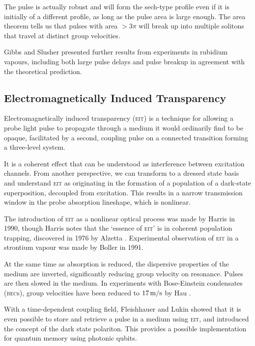     The pulse is actually robust and will form the sech-type profile even if it
    is initially of a different profile, as long as the pulse area is large
    enough. The area theorem\cite{McCall1969} tells us that pulses with area $>
    3\pi$ will break up into multiple solitons that travel at distinct group
    velocities.

    Gibbs and Slusher presented further results from experiments in rubidium
    vapours,\cite{Slusher1972} including both large pulse delays and pulse
    breakup in agreement with the theoretical prediction.

  \subsection*{Electromagnetically Induced Transparency}

    Electromagnetically induced transparency (\textsc{eit}) is a technique for
    allowing a probe light pulse to propagate through a medium it would
    ordinarily find to be opaque, facilitated by a second, coupling pulse on a
    connected transition forming a three-level system.\cite{Fleischhauer2005}

    It is a coherent effect that can be understood as interference between
    excitation channels. From another perspective, we can transform to a
    dressed state basis and understand \textsc{eit} as originating in the
    formation of a population of a dark-state superposition, decoupled from
    excitation. This results in a narrow transmission window in the probe
    absorption lineshape, which is nonlinear.

    The introduction of \textsc{eit} as a nonlinear optical process was made by
    Harris \etal in 1990\cite{Harris1990}, though Harris notes\cite{Harris1997}
    that the `essence of \textsc{eit}' is in coherent population trapping,
    discovered in 1976 by Alzetta \etal\cite{Alzetta1976}. Experimental
    observation of \textsc{eit} in a strontium vapour was made by Boller
    \etal\cite{Boller1991} in 1991.

    At the same time as absorption is reduced, the dispersive properties of the
    medium are inverted, significantly reducing group velocity on resonance.
    Pulses are then slowed in the medium. In experiments with Bose-Einstein
    condensates (\textsc{bec}s), group velocities have been reduced to 
    $\unit[17]{m/s}$ by Hau \etal\cite{Hau1999}.

    With a time-dependent coupling field, Fleishhauer and Lukin showed that it
    is even possible to store and retrieve a pulse in a medium using
    \textsc{eit}, and introduced the concept of the dark state
    polariton\cite{Fleischhauer2000}. This provides a possible implementation
    for quantum memory using photonic qubits\cite{Lvovsky2009}.

  

  